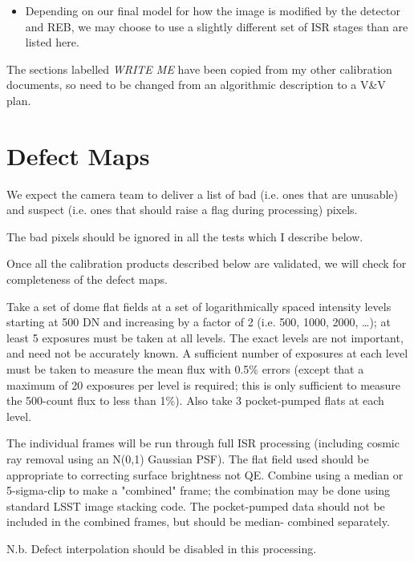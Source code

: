 \documentclass[DM,authoryear,toc,lsstdraft]{lsstdoc}
\begin{document}
\begin{itemize}
\item Depending on our final model for how the image is modified by the detector and REB, we may choose to use a
slightly different set of ISR stages than are listed here.
\end{itemize}

The sections labelled \emph{WRITE ME} have been copied from my other calibration documents, so need to
be changed from an algorithmic description to a V\&V plan.

\section{Defect Maps}

We expect the camera team to deliver a list of bad (i.e. ones that are unusable) and suspect (i.e.
ones that should raise a flag during processing) pixels.

The bad pixels should be ignored in all the tests which I describe below.

Once all the calibration products described below are validated, we will check for completeness of
the defect maps.

Take a set of dome flat fields at a set of logarithmically spaced intensity
levels starting at 500 DN and increasing by a factor of 2 (i.e. 500, 1000, 2000, \ldots{}); at least 5 exposures
must be taken at all levels.  The exact levels are not important, and need not be accurately known.  A
sufficient number of exposures at each level must be taken to measure the mean flux with 0.5\% errors (except
that a maximum of 20 exposures per level is required; this is only sufficient to measure the 500-count flux to
less than 1\%).  Also take 3 pocket-pumped flats at each level.

The individual frames will be run through full ISR processing (including cosmic ray removal using an N(0,1)
Gaussian PSF).  The flat field used should be appropriate to correcting surface brightness not QE. Combine
using a median or 5-sigma-clip to make a "combined" frame; the combination may be done using standard LSST image
stacking code.  The pocket-pumped data should not be included in the combined frames, but should be median-
combined separately.

N.b. Defect interpolation should be disabled in this processing.
\end{document}
